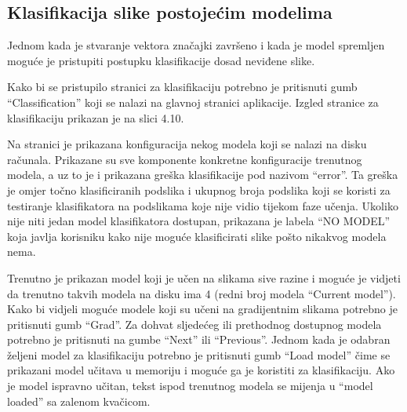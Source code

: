 \documentclass[times, utf8, zavrsni]{fer}
\begin{document}
\subsection{Klasifikacija slike postojećim modelima}

Jednom kada je stvaranje vektora značajki završeno i kada je model spremljen 
moguće je pristupiti postupku klasifikacije dosad neviđene slike. 

Kako bi se pristupilo stranici za klasifikaciju potrebno je 
pritisnuti gumb \enquote{Classification} koji se nalazi na glavnoj 
stranici aplikacije. Izgled stranice za klasifikaciju prikazan je na 
slici 4.10.

\bigbreak 

Na stranici je prikazana konfiguracija nekog modela koji se nalazi na 
disku računala. Prikazane su sve komponente konkretne konfiguracije
trenutnog modela, a uz to je i prikazana greška klasifikacije pod
nazivom \enquote{error}. Ta greška je omjer točno klasificiranih
podslika i ukupnog broja podslika koji se koristi za testiranje klasifikatora
na podslikama koje nije vidio tijekom faze učenja. Ukoliko nije niti 
jedan model klasifikatora dostupan, prikazana je labela \enquote{NO MODEL}
koja javlja korisniku kako nije moguće klasificirati slike pošto nikakvog modela
nema.

\bigbreak

Trenutno je prikazan model koji je učen na slikama sive razine i moguće
je vidjeti da trenutno takvih modela na disku ima 4 (redni broj modela
\enquote{Current model}). Kako bi vidjeli moguće modele koji su učeni na
gradijentnim slikama potrebno je pritisnuti gumb \enquote{Grad}. Za dohvat
sljedećeg ili prethodnog dostupnog modela potrebno je pritisnuti na 
gumbe \enquote{Next} ili \enquote{Previous}. Jednom kada je odabran željeni
model za klasifikaciju potrebno je pritisnuti gumb \enquote{Load model} čime
se prikazani model učitava u memoriju i moguće ga je koristiti za klasifikaciju.
Ako je model ispravno učitan, tekst ispod trenutnog modela se mijenja
u \enquote{model loaded} sa zalenom kvačicom.

\bigbreak 
\end{document}

